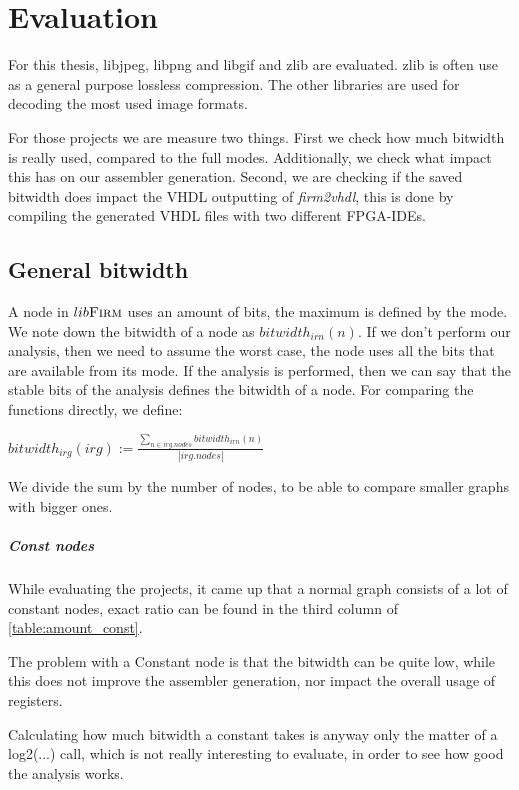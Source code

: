 \chapter{Evaluation}\label{sec:eval}

For this thesis, libjpeg, libpng and libgif and zlib are evaluated. zlib is often use as a general purpose lossless compression. The other libraries are used for decoding the most used image formats.

For those projects we are measure two things. 
First we check how much bitwidth is really used, compared to the full modes. Additionally, we check what impact this has on our assembler generation.
Second, we are checking if the saved bitwidth does impact the VHDL outputting of \textit{firm2vhdl}, this is done by compiling the generated VHDL files with two different FPGA-IDEs.

\section{General bitwidth}
A node in $lib\textsc{Firm}$ uses an amount of bits, the maximum is defined by the mode. We note down the bitwidth of a node as $bitwidth_{irn}(n)$.
If we don't perform our analysis, then we need to assume the worst case, the node uses all the bits that are available from its mode.
If the analysis is performed, then we can say that the stable bits of the analysis defines the bitwidth of a node.
For comparing the functions directly, we define:

$bitwidth_{irg}(irg) := \frac{\sum\nolimits_{n \in irg.nodes} bitwidth_{irn}(n)}{|irg.nodes|} $ 

We divide the sum by the number of nodes, to be able to compare smaller graphs with bigger ones. 

\paragraph{Const nodes}

While evaluating the projects, it came up that a normal graph consists of a lot of constant nodes, exact ratio can be found in the third column of  \autoref{table:amount_const}. 

The problem with a Constant node is that the bitwidth can be quite low, while this does not improve the assembler generation, nor impact the overall usage of registers.

Calculating how much bitwidth a constant takes is anyway only the matter of a log2(...) call, which is not really interesting to evaluate, in order to see how good the analysis works.

